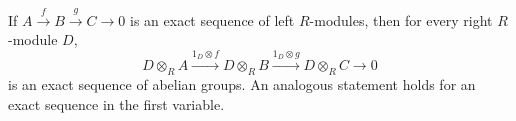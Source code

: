 If $A \xrightarrow{f} B \xrightarrow{g} C \to 0$ is an exact sequence of left $R$-modules, then for every right $R$-module $D$,
\[
D \otimes_R A \xrightarrow{1_D \otimes f} D \otimes_R B \xrightarrow{1_D \otimes g} D \otimes_R C \to 0
\]
is an exact sequence of abelian groups. An analogous statement holds for an exact sequence in the first variable.
